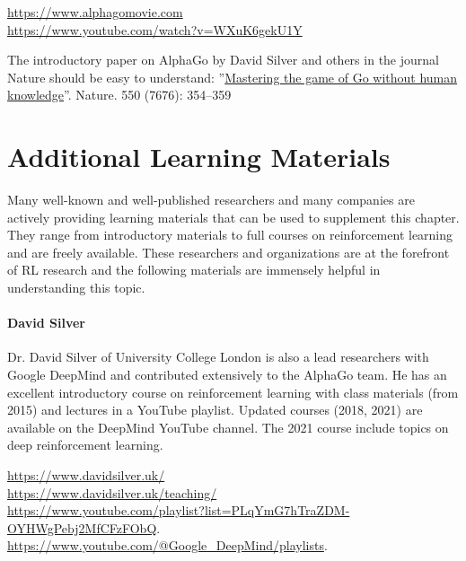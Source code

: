 \begin{withcode}
\begin{resourcebox}
\small
\url{https://www.alphagomovie.com} \\

\url{https://www.youtube.com/watch?v=WXuK6gekU1Y}
\normalsize
\end{resourcebox}

The introductory paper on AlphaGo by David Silver and others in the journal Nature should be easy to understand: ''\href{https://www.nature.com/articles/nature24270}{Mastering the game of Go without human knowledge}''. Nature. 550 (7676): 354--359

\end{withcode}

\section{Additional Learning Materials}

Many well-known and well-published researchers and many companies are actively providing learning materials that can be used to supplement this chapter. They range from introductory materials to full courses on reinforcement learning and are freely available. These researchers and organizations are at the forefront of RL research and the following materials are immensely helpful in understanding this topic.

\paragraph*{David Silver}
Dr. David Silver of University College London is also a lead researchers with Google DeepMind and contributed extensively to the AlphaGo team. He has an excellent introductory course on reinforcement learning with class materials (from 2015) and lectures in a YouTube playlist. Updated courses (2018, 2021) are available on the DeepMind YouTube channel. The 2021 course include topics on deep reinforcement learning. \\

\begin{resourcebox}
\footnotesize
\url{https://www.davidsilver.uk/} \\

\url{https://www.davidsilver.uk/teaching/} \\

\url{https://www.youtube.com/playlist?list=PLqYmG7hTraZDM-OYHWgPebj2MfCFzFObQ}. \\

\url{https://www.youtube.com/@Google_DeepMind/playlists}.
\end{resourcebox}

